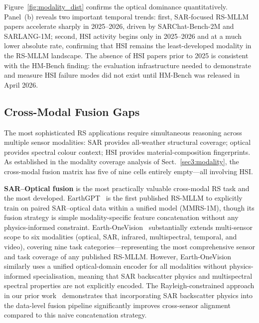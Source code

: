 Figure~\ref{fig:modality_dist} confirms the optical dominance quantitatively.
Panel~(b) reveals two important temporal trends: first, SAR-focused RS-MLLM
papers accelerate sharply in 2025--2026, driven by SARChat-Bench-2M and SARLANG-1M;
second, HSI activity begins only in 2025--2026 and at a much lower absolute
rate, confirming that HSI remains the least-developed modality in the RS-MLLM
landscape. The absence of HSI papers prior to 2025 is consistent with the
HM-Bench finding: the evaluation infrastructure needed to demonstrate and
measure HSI failure modes did not exist until HM-Bench was released in April 2026.

\subsection{Cross-Modal Fusion Gaps}\label{sec5:fusion}

The most sophisticated RS applications require simultaneous reasoning across
multiple sensor modalities: SAR provides all-weather structural coverage;
optical provides spectral colour context; HSI provides material-composition
fingerprints. As established in the modality coverage analysis of
Sect.~\ref{sec3:modality}, the cross-modal fusion matrix has five of nine
cells entirely empty---all involving HSI.

\textbf{SAR--Optical fusion} is the most practically valuable cross-modal RS
task and the most developed. EarthGPT~\cite{earthgpt2025} is the first published
RS-MLLM to explicitly train on paired SAR--optical data within a unified
model (MMRS-1M), though its fusion strategy is simple modality-specific
feature concatenation without any physics-informed constraint.
Earth-OneVision~\cite{earthonevision2026} substantially extends multi-sensor
scope to six modalities (optical, SAR, infrared, multispectral, temporal, and
video), covering nine task categories---representing the most comprehensive
sensor and task coverage of any published RS-MLLM. However, Earth-OneVision
similarly uses a unified optical-domain encoder for all modalities without
physics-informed specialisation, meaning that SAR backscatter physics and
multispectral spectral properties are not explicitly encoded. The Rayleigh-constrained
approach in our prior work~\cite{rayleigh2026} demonstrates that incorporating SAR
backscatter physics into the data-level fusion pipeline significantly improves
cross-sensor alignment compared to this naive concatenation strategy.

